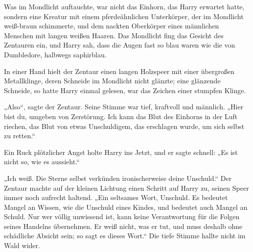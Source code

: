 Was im Mondlicht auftauchte, war nicht das Einhorn, das Harry erwartet hatte, sondern eine Kreatur mit einem pferdeähnlichen Unterkörper, der im Mondlicht weiß-braun schimmerte, und dem nackten Oberkörper eines männlichen Menschen mit langen weißen Haaren. Das Mondlicht fing das Gesicht des Zentauren ein, und Harry sah, dass die Augen fast so blau waren wie die von Dumbledore, halbwegs saphirblau.

In einer Hand hielt der Zentaur einen langen Holzspeer mit einer übergroßen Metallklinge, deren Schneide im Mondlicht nicht glänzte; eine glänzende Schneide, so hatte Harry einmal gelesen, war das Zeichen einer stumpfen Klinge.

„Also“, sagte der Zentaur. Seine Stimme war tief, kraftvoll und männlich.
„Hier bist du, umgeben von Zerstörung. Ich kann das Blut des Einhorns in der Luft riechen, das Blut von etwas Unschuldigem, das erschlagen wurde, um sich selbst zu retten.“

Ein Ruck plötzlicher Angst holte Harry ins Jetzt, und er sagte schnell:
„Es ist nicht so, wie es aussieht.“

„Ich weiß. Die Sterne selbst verkünden ironischerweise deine Unschuld.“
Der Zentaur machte auf der kleinen Lichtung einen Schritt auf Harry zu, seinen Speer immer noch aufrecht haltend.
„Ein seltsames Wort, Unschuld. Es bedeutet Mangel an Wissen, wie die Unschuld eines Kindes, und bedeutet auch Mangel an Schuld. Nur wer völlig unwissend ist, kann keine Verantwortung für die Folgen seines Handelns übernehmen. Er weiß nicht, was er tut, und muss deshalb ohne schädliche Absicht sein; so sagt es dieses Wort.“
Die tiefe Stimme hallte nicht im Wald wider.

